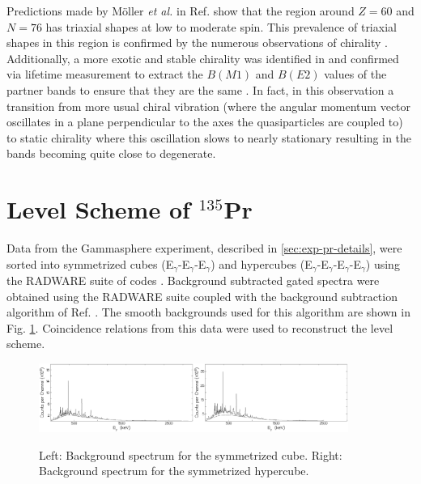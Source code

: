 Predictions made by M\"oller \emph{et al.} in Ref. \cite{groundStateTriax} show that the region around $Z=60$ and $N=76$ has triaxial shapes at low to moderate spin. This prevalence of triaxial shapes in this region is confirmed by the numerous observations of chirality \cite{chiralityIn134Pr,chiralityA130Region,chiralityUpperA130Region,chiralityA130Region2,chirality136Pm,chiralityMore135Nd,chiralityIn135Nd,chiralityMulti133Cs}. Additionally, a more exotic and stable chirality was identified in \cite{chiralityMore135Nd,chiralityIn135Nd} and confirmed via lifetime measurement to extract the $B(M1)$ and $B(E2)$ values of the partner bands to ensure that they are the same \cite{chiralityIn135Nd}. In fact, in this observation a transition from more usual chiral vibration (where the angular momentum vector oscillates in a plane perpendicular to the axes the quasiparticles are coupled to) to static chirality where this oscillation slows to nearly stationary resulting in the bands becoming quite close to degenerate.

\section{Level Scheme of $^{135}$Pr}
\label{sec:trw-lvl-scheme}
Data from the Gammasphere experiment, described in \ref{sec:exp-pr-details}, were sorted into symmetrized cubes (E$_{\gamma{}}$-E$_{\gamma{}}$-E$_{\gamma{}}$) and hypercubes (E$_{\gamma{}}$-E$_{\gamma{}}$-E$_{\gamma{}}$-E$_{\gamma{}}$) using the RADWARE suite of codes \cite{radware}. Background subtracted gated spectra were obtained using the RADWARE suite coupled with the background subtraction algorithm of Ref. \cite{symBGSub}. The smooth backgrounds used for this algorithm are shown in Fig. \ref{fig:chp4-bg-specs}. Coincidence relations from this data were used to reconstruct the level scheme.
\begin{figure}[bh!]
\centerline{\includegraphics[width=0.45\textwidth]{./img/c4/trips_bg.pdf}\includegraphics[width=0.45\textwidth]{./img/c4/quads_bg.pdf}}
	\caption{Left: Background spectrum for the symmetrized cube. Right: Background spectrum for the symmetrized hypercube. \label{fig:chp4-bg-specs}}
\end{figure}


